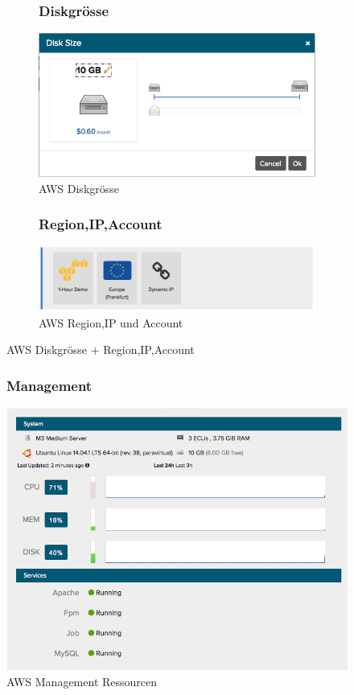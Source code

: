 \begin{figure}[!htbp]
  \centering
  \begin{subfigure}[b]{.49\textwidth}
\subsubsection{Diskgrösse}
\includegraphics[width=\textwidth]{./03_Analyse/03_Bitnami/images/aws_disk}
\caption{AWS Diskgrösse}
\end{subfigure}
  \hfill
\begin{subfigure}[b]{.49\textwidth}
\subsubsection{Region,IP,Account}
\includegraphics[width=\textwidth]{./03_Analyse/03_Bitnami/images/aws_random}
\caption{AWS Region,IP und Account}
\end{subfigure}
\caption{AWS Diskgrösse + Region,IP,Account}
\end{figure}

\newpage
 
\begin{figure}[!htbp]
   \centering
    \subsubsection{Management}
\includegraphics[width=.5\textwidth]{./03_Analyse/03_Bitnami/images/aws_resourcen}
\caption{AWS Management Ressourcen}
\end{figure}


